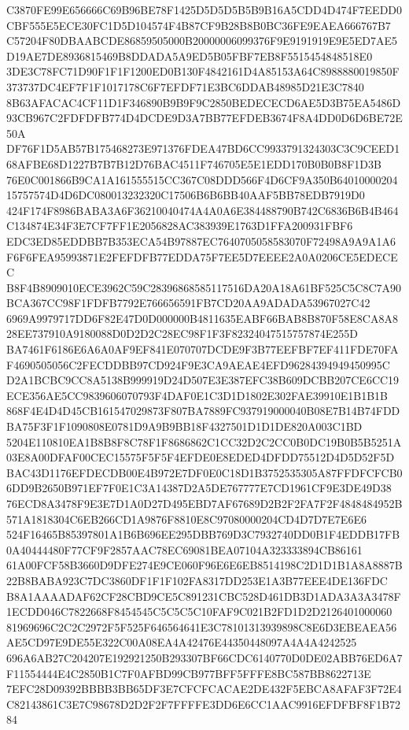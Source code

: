 \documentclass[UTF8,fontset=fandol,zihao=-4,a4paper]{ctexart}
\begin{document}
{{C3870FE99E656666C69B96BE78F1425D5D5D5B5B9B16A5CDD4D474F7EEDD0CBF555E5ECE30FC1D5D104574F4B87CF9B28B8B0BC36FE9EAEA666767B7
C57204F80DBAABCDE86859505000B20000006099376F9E9191919E9E5ED7AE5D19AE7DE8936815469B8DDADA5A9ED5B05FBF7EB8F5515454848518E0
3DE3C78FC71D90F1F1F1200ED0B130F4842161D4A85153A64C8988880019850F373737DC4EF7F1F1017178C6F7EFDF71E3BC6DDAB48985D21E3C7840
8B63AFACAC4CF11D1F346890B9B9F9C2850BEDECECD6AE5D3B75EA5486D93CB967C2FDFDFB774D4DCDE9D3A7BB77EFDEB3674F8A4DD0D6D6BE72E50A
DF76F1D5AB57B175468273E971376FDEA47BD6CC9933791324303C3C9CEED168AFBE68D1227B7B7B12D76BAC4511F746705E5E1EDD170B0B0B8F1D3B
76E0C001866B9CA1A161555515CC367C08DDD566F4D6CF9A350B6401000020415757574D4D6DC080013232320C17506B6B6BB40AAF5BB78EDB7919D0
424F174F8986BABA3A6F36210040474A4A0A6E384488790B742C6836B6B4B464C134874E34F3E7CF7FF1E2056828AC383939E1763D1FFA200931FBF6
EDC3ED85EDDBB7B353ECA54B97887EC7640705058583070F72498A9A9A1A6F6F6FEA95993871E2FEFDFB77EDDA75F7EE5D7EEEE2A0A0206CE5EDECEC
B8F4B8909010ECE3962C59C28396868585117516DA20A18A61BF525C5C8C7A90BCA367CC98F1FDFB7792E766656591FB7CD20AA9ADADA53967027C42
6969A9979717DD6F82E47D0D000000B4811635EABF66BAB8B870F58E8CA8A828EE737910A9180088D0D2D2C28EC98F1F3F82324047515757874E255D
BA7461F6186E6A6A0AF9EF841E070707DCDE9F3B77EEFBF7EF411FDE70FAF4690505056C2FECDDBB97CD924F9E3CA9AEAE4EFD96284394949450995C
D2A1BCBC9CC8A5138B999919D24D507E3E387EFC38B609DCBB207CE6CC19ECE356AE5CC9839606070793F4DAF0E1C3D1D1802E302FAE39910E1B1B1B
868F4E4D4D45CB161547029873F807BA7889FC937919000040B08E7B14B74FDDBA75F3F1F1090808E0781D9A9B9BB18F4327501D1D1DE820A003C1BD
5204E110810EA1B8B8F8C78F1F8686862C1CC32D2C2CC0B0DC19B0B5B5251A03E8A00DFAF00CEC15575F5F5F4EFDE0E8EDED4DFDD75512D4D5D52F5D
BAC43D1176EFDECDB00E4B972E7DF0E0C18D1B3752535305A87FFDFCFCB06DD9B2650B971EF7F0E1C3A14387D2A5DE767777E7CD1961CF9E3DE49D38
76ECD8A3478F9E3E7D1A0D27D495EBD7AF67689D2B2F2FA7F2F4848484952B571A1818304C6EB266CD1A9876F8810E8C97080000204CD4D7D7E7E6E6
524F16465B85397801A1B6B696EE295DBB769D3C7932740DD0B1F4EDDB17FB0A40444480F77CF9F2857AAC78EC69081BEA07104A323333894CB86161
61A00FCF58B3660D9DFE274E9CE060F96E6E6EB8514198C2D1D1B1A8A8887B22B8BABA923C7DC3860DF1F1F102FA8317DD253E1A3B77EEE4DE136FDC
B8A1AAAADAF62CF28CBD9CE5C891231CBC528D461DB3D1ADA3A3A3478F1ECDD046C7822668F8454545C5C5C5C10FAF9C021B2FD1D2D2126401000060
81969696C2C2C2972F5F525F646564641E3C78101313939898C8E6D3EBEAEA56AE5CD97E9DE55E322C00A08EA4A42476E44350448097A4A4A4242525
696A6AB27C204207E192921250B293307BF66CDC6140770D0DE02ABB76ED6A7F11554444E4C2850B1C7F0AFBD99CB977BFF5FFFE8BC587BB8622713E
7EFC28D09392BBBB3BB65DF3E7CFCFCACAE2DE432F5EBCA8AFAF3F72E4C82143861C3E7C98678D2D2F2F7FFFFE3DD6E6CC1AAC9916EFDFBF8F1B7284
}}
\end{document}
